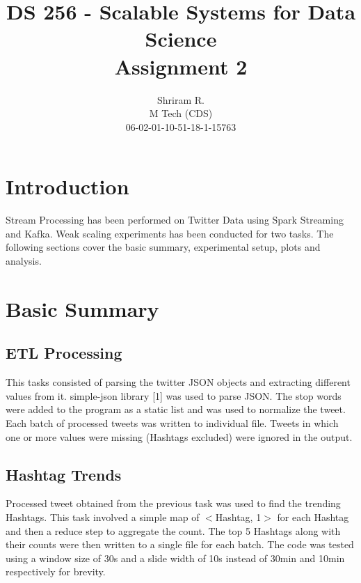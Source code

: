 \documentclass[11pt,a4paper,oneside]{article}
\begin{document}
	\title{DS 256 - Scalable Systems for Data Science \\ Assignment 2}
	\author{Shriram R. \\ M Tech (CDS) \\ 06-02-01-10-51-18-1-15763}
	\maketitle
	
	\section{Introduction}
	Stream Processing has been performed on Twitter Data using Spark Streaming and Kafka. Weak scaling experiments has been conducted for two tasks. The following sections cover the basic summary, experimental setup, plots and analysis.
	
	\section{Basic Summary}
	
	\subsection{ETL Processing}
	This tasks consisted of parsing the twitter JSON objects and extracting different values from it. simple-json library [1] was used to parse JSON. The stop words were added to the program as a static list and was used to normalize the tweet. Each batch of processed tweets was written to individual file. Tweets in which one or more values were missing (Hashtags excluded) were ignored in the output.
	
	\subsection{Hashtag Trends}	
	Processed tweet obtained from the previous task was used to find the trending Hashtags. This task involved a simple map of $<$Hashtag, 1$>$ for each Hashtag and then a reduce step to aggregate the count. The top 5 Hashtags along with their counts were then written to a single file for each batch. The code was tested using a window size of 30s and a slide width of 10s instead of 30min and 10min respectively for brevity.
	
\end{document}
